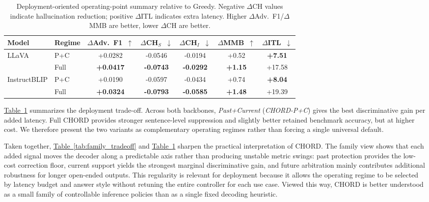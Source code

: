 \documentclass[sigconf,anonymous]{acmart}
\newcommand{\Tref}[1]{\hyperref[#1]{Table~\ref*{#1}}}
\begin{document}
\begin{table}[!b]
\centering
\scriptsize
\setlength{\tabcolsep}{3.5pt}
\caption{Deployment-oriented operating-point summary relative to Greedy. Negative $\Delta$CH values indicate hallucination reduction; positive $\Delta$ITL indicates extra latency. Higher $\Delta$Adv.\ F1/$\Delta$MMB are better, lower $\Delta$CH are better.}
\label{tab:operating_points}
\begin{tabular}{l l c c c c c}
\toprule
\textbf{Model} & \textbf{Regime} & $\Delta$Adv.\ F1~$\uparrow$ & $\Delta$CH$_S$~$\downarrow$ & $\Delta$CH$_I$~$\downarrow$ & $\Delta$MMB~$\uparrow$ & $\Delta$ITL~$\downarrow$ \\
\midrule
\multirow{2}{*}{LLaVA}
& P+C & +0.0282 & -0.0546 & -0.0194 & +0.52 & \textbf{+7.51} \\
& Full & \textbf{+0.0417} & \textbf{-0.0743} & \textbf{-0.0292} & \textbf{+1.15} & +17.58 \\
\midrule
\multirow{2}{*}{InstructBLIP}
& P+C & +0.0190 & -0.0597 & -0.0434 & +0.74 & \textbf{+8.04} \\
& Full & \textbf{+0.0324} & \textbf{-0.0793} & \textbf{-0.0585} & \textbf{+1.48} & +19.39 \\
\bottomrule
\end{tabular}
\end{table}

\Tref{tab:operating_points} summarizes the deployment trade-off. Across both backbones, \textit{Past+Current} (\textit{CHORD-P+C}) gives the best discriminative gain per added latency. Full CHORD provides stronger sentence-level suppression and slightly better retained benchmark accuracy, but at higher cost. We therefore present the two variants as complementary operating regimes rather than forcing a single universal default.

Taken together, \Tref{tab:family_tradeoff} and \Tref{tab:operating_points} sharpen the practical interpretation of CHORD. The family view shows that each added signal moves the decoder along a predictable axis rather than producing unstable metric swings: past protection provides the low-cost correction floor, current support yields the strongest marginal discriminative gain, and future arbitration mainly contributes additional robustness for longer open-ended outputs. This regularity is relevant for deployment because it allows the operating regime to be selected by latency budget and answer style without retuning the entire controller for each use case. Viewed this way, CHORD is better understood as a small family of controllable inference policies than as a single fixed decoding heuristic.
\end{document}

